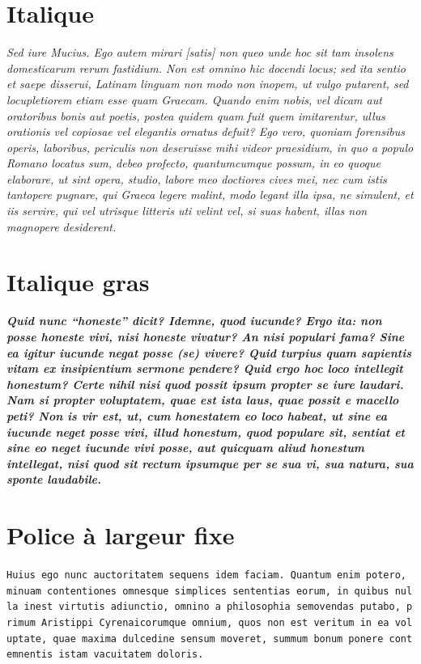 \documentclass[twoside]{extreport}
\begin{document}
\hypertarget{italique}{%
\section{Italique}\label{italique}}

\emph{Sed iure Mucius. Ego autem mirari {[}satis{]} non queo unde hoc
sit tam insolens domesticarum rerum fastidium. Non est omnino hic
docendi locus; sed ita sentio et saepe disserui, Latinam linguam non
modo non inopem, ut vulgo putarent, sed locupletiorem etiam esse quam
Graecam. Quando enim nobis, vel dicam aut oratoribus bonis aut poetis,
postea quidem quam fuit quem imitarentur, ullus orationis vel copiosae
vel elegantis ornatus defuit? Ego vero, quoniam forensibus operis,
laboribus, periculis non deseruisse mihi videor praesidium, in quo a
populo Romano locatus sum, debeo profecto, quantumcumque possum, in eo
quoque elaborare, ut sint opera, studio, labore meo doctiores cives mei,
nec cum istis tantopere pugnare, qui Graeca legere malint, modo legant
illa ipsa, ne simulent, et iis servire, qui vel utrisque litteris uti
velint vel, si suas habent, illas non magnopere desiderent.}

\hypertarget{italique-gras}{%
\section{Italique gras}\label{italique-gras}}

\emph{\textbf{Quid nunc ``honeste'' dicit? Idemne, quod iucunde? Ergo
ita: non posse honeste vivi, nisi honeste vivatur? An nisi populari
fama? Sine ea igitur iucunde negat posse (se) vivere? Quid turpius quam
sapientis vitam ex insipientium sermone pendere? Quid ergo hoc loco
intellegit honestum? Certe nihil nisi quod possit ipsum propter se iure
laudari. Nam si propter voluptatem, quae est ista laus, quae possit e
macello peti? Non is vir est, ut, cum honestatem eo loco habeat, ut sine
ea iucunde neget posse vivi, illud honestum, quod populare sit, sentiat
et sine eo neget iucunde vivi posse, aut quicquam aliud honestum
intellegat, nisi quod sit rectum ipsumque per se sua vi, sua natura, sua
sponte laudabile.}}

\hypertarget{police-uxe0-largeur-fixe}{%
\section{Police à largeur fixe}\label{police-uxe0-largeur-fixe}}

\texttt{Huius\ ego\ nunc\ auctoritatem\ sequens\ idem\ faciam.\ Quantum\ enim\ potero,\ minuam\ contentiones\ omnesque\ simplices\ sententias\ eorum,\ in\ quibus\ nulla\ inest\ virtutis\ adiunctio,\ omnino\ a\ philosophia\ semovendas\ putabo,\ primum\ Aristippi\ Cyrenaicorumque\ omnium,\ quos\ non\ est\ veritum\ in\ ea\ voluptate,\ quae\ maxima\ dulcedine\ sensum\ moveret,\ summum\ bonum\ ponere\ contemnentis\ istam\ vacuitatem\ doloris.}
\end{document}
